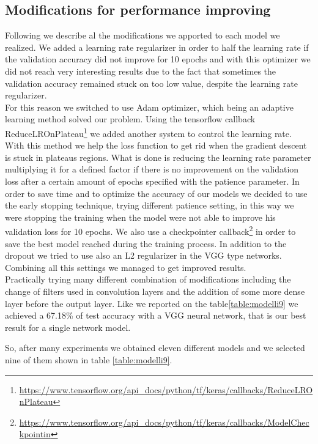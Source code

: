 \documentclass[10pt,twocolumn,letterpaper]{article}
\begin{document}
\subsection{Modifications for performance improving}
Following we describe al the modifications we apported to each model we realized.
We added a learning rate regularizer in order to half the learning rate if the validation accuracy did not improve for 10 epochs and with this optimizer we did not reach very interesting results due to the fact that sometimes the validation accuracy remained stuck on too low value, despite the learning rate regularizer. \\
For this reason we switched to use Adam optimizer, which being an adaptive learning method solved our problem.
Using the tensorflow callback ReduceLROnPlateau\footnote{\url{https://www.tensorflow.org/api_docs/python/tf/keras/callbacks/ReduceLROnPlateau}} we added another system to control the learning rate. \\
With this method we help the loss function to get rid when the gradient descent is stuck in plateaus regions. What is done is reducing the learning rate parameter multiplying it for a defined factor if there is no improvement on the validation loss after a certain amount of epochs specified with the patience parameter. In order to save time and to optimize the accuracy of our models we decided to use the early stopping technique, trying different patience setting, in this way we were stopping the training when the model were not able to improve his validation loss for 10 epochs. We also use a checkpointer callback\footnote{\url{https://www.tensorflow.org/api_docs/python/tf/keras/callbacks/ModelCheckpointin}} in order to save the best model reached during the training process. In addition to the dropout we tried to use also an L2 regularizer in the VGG type networks. Combining all this settings we managed to get improved results.\\
Practically trying many different combination of modifications including the change of filters used in convolution layers and the addition of some more dense layer before the output layer. Like we reported on the table\ref{table:modelli9} we achieved a 67.18\% of test accuracy with a VGG neural network, that is our best result for a single network model. 

So, after many experiments we obtained eleven different models and we selected nine of them shown in table \ref{table:modelli9}. 
\end{document}
